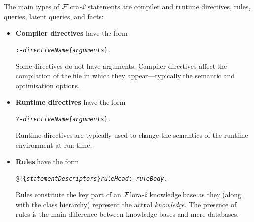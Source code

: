 \documentclass[11pt]{article}
\newcommand{\FLORA}{{\mbox{\sc ${\cal F}${lora}\rm\emph{-2}}}\xspace}
\newcommand{\FLSYSTEM}{\FLORA}
\begin{document}
The main types of \FLSYSTEM statements are compiler and runtime directives,
rules, queries, latent queries, and facts:
\begin{itemize}
\item  \textbf{Compiler directives} have the form\\
\begin{alltt}
     :- \emph{directiveName}\{\emph{arguments}\}. 
\end{alltt}
  Some directives do not have arguments. Compiler directives affect the
  compilation of the file in which they appear---typically the
  semantic and optimization options.
\item \textbf{Runtime directives} have the form\\  
\begin{alltt}
     ?- \emph{directiveName}\{\emph{arguments}\}. 
\end{alltt}
  Runtime directives are typically used to change the semantics of the
  runtime environment at run time.
\item \textbf{Rules} have the form\\
\begin{alltt}
     @!\{\emph{statementDescriptors}\}  \emph{ruleHead}  :-  \emph{ruleBody}. 
\end{alltt}
  Rules constitute the key part of an \FLSYSTEM knowledge base
  as they (along with the class hierarchy)
  represent the actual \emph{knowledge}.
  The presence of rules is the main difference between knowledge bases and
  mere databases.


\end{itemize}
\end{document}
